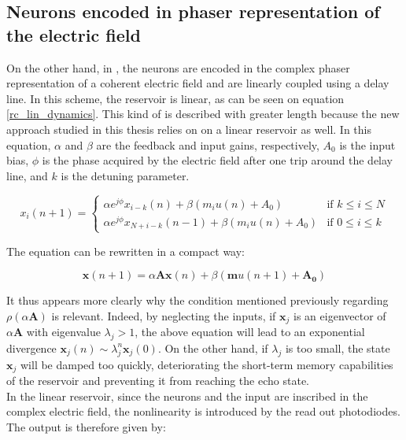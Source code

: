 \subsection{Neurons encoded in phaser representation of the electric field}

\label{rc-lin-complex}

On the other hand, in \cite{Vinckier2015}, the neurons are encoded in the complex phaser representation of a coherent electric field and are linearly coupled using a delay line. In this scheme, the reservoir is linear, as can be seen on equation \eqref{rc_lin_dynamics}. This kind of \rcer is described with greater length because the new approach studied in this thesis relies on on a linear reservoir as well. In this equation, $\alpha$ and $\beta$ are the feedback and input gains, respectively, $A_0$ is the input bias, $\phi$ is the phase acquired by the electric field after one trip around the delay line, and $k$ is the detuning parameter.

\begin{equation}
	x_i(n+1) = 
	\begin{cases}
		\alpha e^{j\phi} x_{i-k}(n)+\beta \left(m_i u(n) +A_0 \right) & \text{if } k \leq i \leq N\\
		\alpha e^{j\phi} x_{N+i-k}(n-1)+\beta \left(m_i u(n) +A_0 \right) & \text{if } 0 \leq i \leq k			
	\end{cases}
	\label{rc_lin_dynamics}
\end{equation}

The equation can be rewritten in a compact way:

\begin{equation}
	\mathbf{x}(n+1) = \alpha \mathbf{A} \mathbf{x}(n) + \beta (\mathbf{m} u(n+1)+ \mathbf{A_0})
	\label{rc_lin_dynamics}
\end{equation}

It thus appears more clearly why the condition mentioned previously regarding $\rho \left( \alpha \mathbf{A} \right)$ is relevant. Indeed, by neglecting the inputs, if $\mathbf{x}_j$ is an eigenvector of $\alpha \mathbf{A}$ with eigenvalue $\lambda_j>1$, the above equation will lead to an exponential divergence $\mathbf{x}_j(n) \sim \lambda_j^n \mathbf{x}_j(0)$. On the other hand, if $\lambda_j$ is too small, the state $\mathbf{x}_j$ will be damped too quickly, deteriorating the short-term memory capabilities of the reservoir and preventing it from reaching the echo state. \\

In the linear reservoir, since the neurons and the input are inscribed in the complex electric field, the nonlinearity is introduced by the read out photodiodes. The output is therefore given by:


